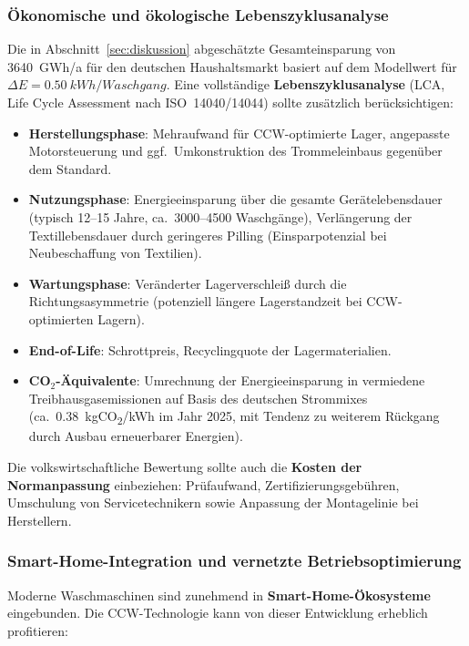 ﻿\documentclass[12pt,a4paper]{article}
\theoremstyle{remark}
\begin{document}
	\subsubsection{Ökonomische und ökologische Lebenszyklusanalyse}
	
	Die in Abschnitt~\ref{sec:diskussion} abgeschätzte Gesamteinsparung von
	\SI{3640}{GWh/a} für den deutschen Haushaltsmarkt basiert auf dem Modellwert für
	$\Delta E = \SI{0,50}{kWh/Waschgang}$. Eine vollständige \textbf{Lebenszyklusanalyse}
	(LCA, Life Cycle Assessment nach ISO~14040/14044) sollte zusätzlich berücksichtigen:
	
	\begin{itemize}
		\item \textbf{Herstellungsphase}: Mehraufwand für CCW-optimierte Lager, angepasste
		Motorsteuerung und ggf.\ Umkonstruktion des Trommeleinbaus gegenüber dem Standard.
		\item \textbf{Nutzungsphase}: Energieeinsparung über die gesamte Gerätelebensdauer
		(typisch 12--15 Jahre, ca.\ 3000--4500 Waschgänge), Verlängerung der Textillebensdauer
		durch geringeres Pilling (Einsparpotenzial bei Neubeschaffung von Textilien).
		\item \textbf{Wartungsphase}: Veränderter Lagerverschleiß durch die Richtungs\-asymme\-trie
		(potenziell längere Lagerstandzeit bei CCW-optimierten Lagern).
		\item \textbf{End-of-Life}: Schrottpreis, Recyclingquote der Lagermaterialien.
		\item \textbf{CO$_2$-Äquivalente}: Umrechnung der Energieeinsparung in vermiedene
		Treibhausgasemissionen auf Basis des deutschen Strommixes (ca.\ \SI{0,38}{kgCO_2/kWh}
		im Jahr 2025, mit Tendenz zu weiterem Rückgang durch Ausbau erneuerbarer Energien).
	\end{itemize}
	
	Die volkswirtschaftliche Bewertung sollte auch die \textbf{Kosten der Normanpassung}
	einbeziehen: Prüfaufwand, Zertifizierungsgebühren, Umschulung von Servicetechnikern
	sowie Anpassung der Montagelinie bei Herstellern.
	
	\subsubsection{Smart-Home-Integration und vernetzte Betriebsoptimierung}
	
	Moderne Waschmaschinen sind zunehmend in \textbf{Smart-Home-Ökosysteme} eingebunden.
	Die CCW-Technologie kann von dieser Entwicklung erheblich profitieren:
	
\end{document}
